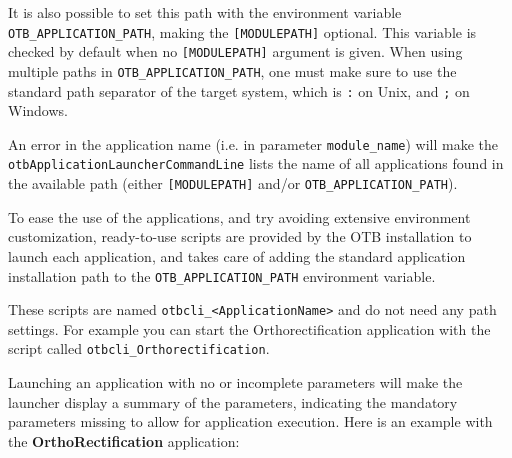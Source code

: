 It is also possible to set this path with the environment variable
\verb?OTB_APPLICATION_PATH?, making the \verb?[MODULEPATH]? optional.
This variable is checked by default when
no \verb?[MODULEPATH]? argument is given.
When using multiple paths in \verb?OTB_APPLICATION_PATH?, one must make sure to use
the standard path separator of the target system, which is \verb?:? on Unix, and \verb?;? on Windows.


An error in the application name (i.e. in parameter
\verb?module_name?) will make the
\verb?otbApplicationLauncherCommandLine? lists the name of all
applications found in the available path (either \verb?[MODULEPATH]?
and/or \verb?OTB_APPLICATION_PATH?).

To ease the use of the applications, and try avoiding extensive environment
customization, ready-to-use scripts are provided by the OTB installation
to launch each application, and takes care of adding the standard application
installation path to the \verb?OTB_APPLICATION_PATH? environment variable.

These scripts are named \verb?otbcli_<ApplicationName>? and do not need any path
settings. For example you can start the Orthorectification application
with the script called \verb?otbcli_Orthorectification?.


Launching an application with no or incomplete parameters will make the
launcher display a summary of the parameters, indicating the mandatory parameters
missing to allow for application execution. Here is an example
with the \textbf{OrthoRectification} application:

